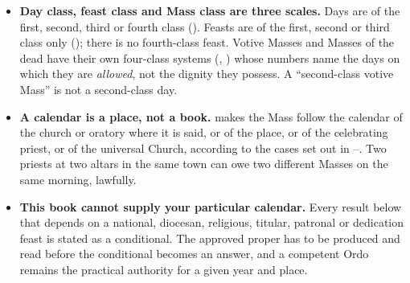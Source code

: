 \begin{itemize}
\item \textbf{Day class, feast class and Mass class are three scales.} Days
are of the first, second, third or fourth class (). Feasts are of the
first, second or third class only (); there is no fourth-class feast.
Votive Masses and Masses of the dead have their own four-class systems
(, ) whose numbers name the days on which they are
\emph{allowed}, not the dignity they possess. A ``second-class votive Mass''
is not a second-class day.

\item \textbf{A calendar is a place, not a book.}  makes the Mass
follow the calendar of the church or oratory where it is said, or of the
place, or of the celebrating priest, or of the universal Church, according to
the cases set out in --. Two priests at two altars in the
same town can owe two different Masses on the same morning, lawfully.

\item \textbf{This book cannot supply your particular calendar.} Every result
below that depends on a national, diocesan, religious, titular, patronal or
dedication feast is stated as a conditional. The approved proper has to be
produced and read before the conditional becomes an answer, and a competent
Ordo remains the practical authority for a given year and place.
\end{itemize}
